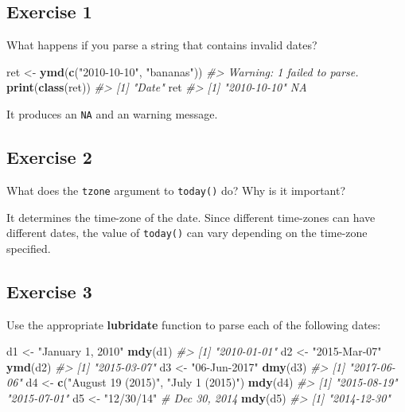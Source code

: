 \documentclass[]{book}
\newenvironment{Shaded}{\begin{snugshade}}{\end{snugshade}}
\newcommand{\CommentTok}[1]{\textcolor[rgb]{0.56,0.35,0.01}{\textit{#1}}}
\newcommand{\KeywordTok}[1]{\textcolor[rgb]{0.13,0.29,0.53}{\textbf{#1}}}
\newcommand{\NormalTok}[1]{#1}
\newcommand{\StringTok}[1]{\textcolor[rgb]{0.31,0.60,0.02}{#1}}
\theoremstyle{definition}
\theoremstyle{definition}
\theoremstyle{definition}
\theoremstyle{remark}
\begin{document}
\hypertarget{exercise-1-41}{%
\subsection{Exercise 1}\label{exercise-1-41}}

What happens if you parse a string that contains invalid dates?

\begin{Shaded}
\begin{Highlighting}[]
\NormalTok{ret <-}\StringTok{ }\KeywordTok{ymd}\NormalTok{(}\KeywordTok{c}\NormalTok{(}\StringTok{"2010-10-10"}\NormalTok{, }\StringTok{"bananas"}\NormalTok{))}
\CommentTok{#> Warning: 1 failed to parse.}
\KeywordTok{print}\NormalTok{(}\KeywordTok{class}\NormalTok{(ret))}
\CommentTok{#> [1] "Date"}
\NormalTok{ret}
\CommentTok{#> [1] "2010-10-10" NA}
\end{Highlighting}
\end{Shaded}

It produces an \texttt{NA} and an warning message.

\hypertarget{exercise-2-40}{%
\subsection{Exercise 2}\label{exercise-2-40}}

What does the \texttt{tzone} argument to \texttt{today()} do? Why is it
important?

It determines the time-zone of the date. Since different time-zones can
have different dates, the value of \texttt{today()} can vary depending
on the time-zone specified.

\hypertarget{exercise-3-28}{%
\subsection{Exercise 3}\label{exercise-3-28}}

Use the appropriate \textbf{lubridate} function to parse each of the
following dates:

\begin{Shaded}
\begin{Highlighting}[]
\NormalTok{d1 <-}\StringTok{ "January 1, 2010"}
\KeywordTok{mdy}\NormalTok{(d1)}
\CommentTok{#> [1] "2010-01-01"}
\NormalTok{d2 <-}\StringTok{ "2015-Mar-07"}
\KeywordTok{ymd}\NormalTok{(d2)}
\CommentTok{#> [1] "2015-03-07"}
\NormalTok{d3 <-}\StringTok{ "06-Jun-2017"}
\KeywordTok{dmy}\NormalTok{(d3)}
\CommentTok{#> [1] "2017-06-06"}
\NormalTok{d4 <-}\StringTok{ }\KeywordTok{c}\NormalTok{(}\StringTok{"August 19 (2015)"}\NormalTok{, }\StringTok{"July 1 (2015)"}\NormalTok{)}
\KeywordTok{mdy}\NormalTok{(d4)}
\CommentTok{#> [1] "2015-08-19" "2015-07-01"}
\NormalTok{d5 <-}\StringTok{ "12/30/14"} \CommentTok{# Dec 30, 2014}
\KeywordTok{mdy}\NormalTok{(d5)}
\CommentTok{#> [1] "2014-12-30"}
\end{Highlighting}
\end{Shaded}
\end{document}
